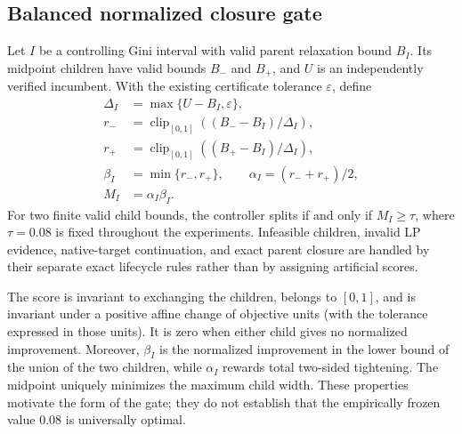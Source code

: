 \subsection{Balanced normalized closure gate}
\label{sec:balanced-normalized-closure}

Let $I$ be a controlling Gini interval with valid parent relaxation bound
$B_I$.  Its midpoint children have valid bounds $B_-$ and $B_+$, and $U$ is
an independently verified incumbent.  With the existing certificate tolerance
$\varepsilon$, define
\begin{align}
\Delta_I &= \max\{U-B_I,\varepsilon\},\\
r_- &= \operatorname{clip}_{[0,1]}((B_- - B_I)/\Delta_I),\\
r_+ &= \operatorname{clip}_{[0,1]}((B_+ - B_I)/\Delta_I),\\
\beta_I &= \min\{r_-,r_+\},\qquad
\alpha_I=(r_-+r_+)/2,\\
M_I &= \alpha_I\beta_I.
\end{align}
For two finite valid child bounds, the controller splits if and only if
$M_I\ge\tau$, where $\tau=0.08$ is fixed throughout the experiments.
Infeasible children, invalid LP evidence, native-target continuation, and exact
parent closure are handled by their separate exact lifecycle rules rather than
by assigning artificial scores.

The score is invariant to exchanging the children, belongs to $[0,1]$, and is
invariant under a positive affine change of objective units (with the tolerance
expressed in those units).  It is zero when either child gives no normalized
improvement.  Moreover, $\beta_I$ is the normalized improvement in the lower
bound of the union of the two children, while $\alpha_I$ rewards total
two-sided tightening.  The midpoint uniquely minimizes the maximum child
width.  These properties motivate the form of the gate; they do not establish
that the empirically frozen value $0.08$ is universally optimal.
